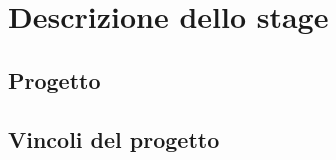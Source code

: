 \chapter{Descrizione dello stage}
\label{cap:descrizione-stage}


\section{Progetto}


\section{Vincoli del progetto}
